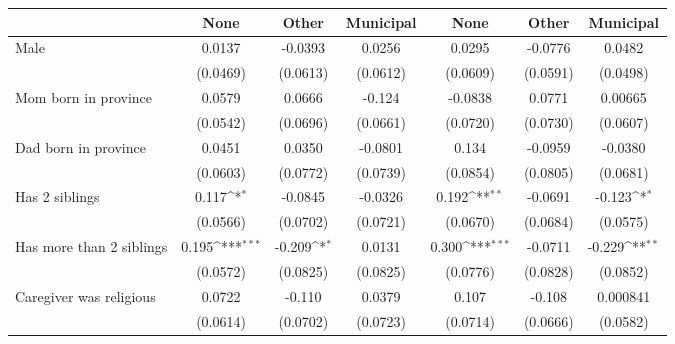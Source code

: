 {
\def\sym#1{\ifmmode^{#1}\else\(^{#1}\)\fi}
\begin{tabular}{l*{6}{c}}
\toprule
                    &\multicolumn{1}{c}{None}&\multicolumn{1}{c}{Other}&\multicolumn{1}{c}{Municipal}&\multicolumn{1}{c}{None}&\multicolumn{1}{c}{Other}&\multicolumn{1}{c}{Municipal}\\
\midrule
Male                &      0.0137         &     -0.0393         &      0.0256         &      0.0295         &     -0.0776         &      0.0482         \\
                    &    (0.0469)         &    (0.0613)         &    (0.0612)         &    (0.0609)         &    (0.0591)         &    (0.0498)         \\
\addlinespace
Mom born in province&      0.0579         &      0.0666         &      -0.124         &     -0.0838         &      0.0771         &     0.00665         \\
                    &    (0.0542)         &    (0.0696)         &    (0.0661)         &    (0.0720)         &    (0.0730)         &    (0.0607)         \\
\addlinespace
Dad born in province&      0.0451         &      0.0350         &     -0.0801         &       0.134         &     -0.0959         &     -0.0380         \\
                    &    (0.0603)         &    (0.0772)         &    (0.0739)         &    (0.0854)         &    (0.0805)         &    (0.0681)         \\
\addlinespace
Has 2 siblings      &       0.117\sym{*}  &     -0.0845         &     -0.0326         &       0.192\sym{**} &     -0.0691         &      -0.123\sym{*}  \\
                    &    (0.0566)         &    (0.0702)         &    (0.0721)         &    (0.0670)         &    (0.0684)         &    (0.0575)         \\
\addlinespace
Has more than 2 siblings&       0.195\sym{***}&      -0.209\sym{*}  &      0.0131         &       0.300\sym{***}&     -0.0711         &      -0.229\sym{**} \\
                    &    (0.0572)         &    (0.0825)         &    (0.0825)         &    (0.0776)         &    (0.0828)         &    (0.0852)         \\
\addlinespace
Caregiver was religious&      0.0722         &      -0.110         &      0.0379         &       0.107         &      -0.108         &    0.000841         \\
                    &    (0.0614)         &    (0.0702)         &    (0.0723)         &    (0.0714)         &    (0.0666)         &    (0.0582)         \\

\end{tabular}}
